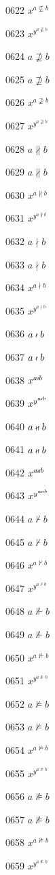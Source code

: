 \documentclass{article}
\begin{document}
0622 $x^{a\nsubseteq b}$\par
0623 $x^{y^{a\nsubseteq b}}$\par
0624 $a\nsupseteq b$\par
0625 $\displaystyle a\nsupseteq b$\par
0626 $x^{a\nsupseteq b}$\par
0627 $x^{y^{a\nsupseteq b}}$\par
0628 $a\nparallel b$\par
0629 $\displaystyle a\nparallel b$\par
0630 $x^{a\nparallel b}$\par
0631 $x^{y^{a\nparallel b}}$\par
0632 $a\nmid b$\par
0633 $\displaystyle a\nmid b$\par
0634 $x^{a\nmid b}$\par
0635 $x^{y^{a\nmid b}}$\par
0636 $a\nshortmid b$\par
0637 $\displaystyle a\nshortmid b$\par
0638 $x^{a\nshortmid b}$\par
0639 $x^{y^{a\nshortmid b}}$\par
0640 $a\nshortparallel b$\par
0641 $\displaystyle a\nshortparallel b$\par
0642 $x^{a\nshortparallel b}$\par
0643 $x^{y^{a\nshortparallel b}}$\par
0644 $a\nvdash b$\par
0645 $\displaystyle a\nvdash b$\par
0646 $x^{a\nvdash b}$\par
0647 $x^{y^{a\nvdash b}}$\par
0648 $a\nVdash b$\par
0649 $\displaystyle a\nVdash b$\par
0650 $x^{a\nVdash b}$\par
0651 $x^{y^{a\nVdash b}}$\par
0652 $a\nvDash b$\par
0653 $\displaystyle a\nvDash b$\par
0654 $x^{a\nvDash b}$\par
0655 $x^{y^{a\nvDash b}}$\par
0656 $a\nVDash b$\par
0657 $\displaystyle a\nVDash b$\par
0658 $x^{a\nVDash b}$\par
0659 $x^{y^{a\nVDash b}}$\par
\end{document}
